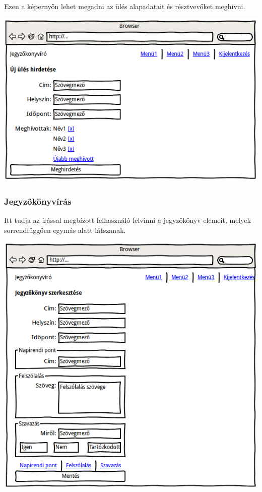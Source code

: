 \documentclass[a4paper,12pt,oneside]{report}
\begin{document}
Ezen a képernyőn lehet megadni az ülés alapadatait és résztvevőket meghívni.

\includegraphics[width=\textwidth]{wireframe-uleshirdetes}

\subsubsection{Jegyzőkönyvírás}

Itt tudja az írással megbízott felhasználó felvinni a jegyzőkönyv elemeit, melyek sorrendfüggően egymás alatt látszanak.

\includegraphics[width=\textwidth]{wireframe-jegyzokonyvszerkesztes}
\end{document}
